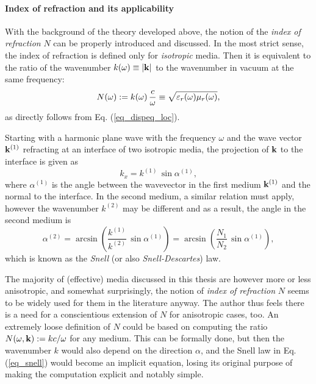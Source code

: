 \paragraph{Index of refraction and its applicability}  %
With the background of the theory developed above, the notion of the \textit{index of refraction} $N$ can be properly introduced and discussed. 
In the most strict sense, the index of refraction is defined only for \textit{isotropic} media. Then it is equivalent to the ratio of the wavenumber $k(\omega) \equiv |{\mathbf{k}}|$ to the wavenumber in vacuum at the same frequency: 
\begin{equation} N(\omega) := k(\omega) \, \frac{c}{\omega} \equiv \sqrt{\varepsilon_r(\omega)\mu_r(\omega)}, \label{eq_}\end{equation}
as directly follows from Eq. (\ref{eq_dispeq_loc}).

Starting with a harmonic plane wave with the frequency $\omega$ and the wave vector ${\mathbf{k}}^{(1)}$ refracting at an interface of two isotropic media, the projection of ${\mathbf{k}}$ to the interface is given as 
$$ k_x = k^{(1)}\,\sin \alpha^{(1)}, $$
where $\alpha^{(1)}$ is the angle between the wavevector in the first medium ${\mathbf{k}}^{(1)}$ and the  normal to the interface. In the second medium, a similar relation must apply, however the wavenumber $k^{(2)}$ may be different and as a result, the angle in the second medium is
\begin{equation} \alpha^{(2)} = \arcsin\left( \frac{k^{(1)}}{k^{(2)}} \,\sin \alpha^{(1)} \right) = \arcsin\left( \frac{N_1}{N_2} \,\sin \alpha^{(1)} \right), \label{eq_snell}\end{equation}
which is known as the \textit{Snell} (or also \textit{Snell-Descartes}) law.

The majority of (effective) media discussed in this thesis are however more or less anisotropic, and somewhat surprisingly, the notion of \textit{index of refraction} $N$ seems to be widely used for them in the literature anyway. The author thus feels there is a need for a conscientious extension of $N$ for anisotropic cases, too. An extremely loose definition of $N$ could be based on computing the ratio $N(\omega, {\mathbf{k}}) := kc/\omega$  for any medium. This can be formally done, but then the wavenumber $k$ would also depend on the direction $\alpha$, and the Snell law in Eq. (\ref{eq_snell}) would become an implicit equation, losing its original purpose of making the computation explicit and notably simple.

